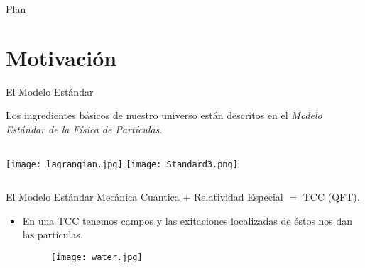 \documentclass{beamer}
\title %
{}
\author %
{}
\date {}
\begin{document}
{
\begin{frame}
\titlepage
\end{frame}
}



\begin{frame}{Plan}
  \tableofcontents
\end{frame}




\section{Motivación}


\begin{frame}{El Modelo Estándar}
\begin{block}{}
Los ingredientes básicos de nuestro universo están descritos en el \textit{Modelo Estándar de la Física de Partículas}.
\end{block}
  \vspace{5mm}
  \begin{columns}
\texttt{[image: lagrangian.jpg]}
\texttt{[image: Standard3.png]}
\end{columns}

\end{frame}

\begin{frame}{El Modelo Estándar}
Mecánica Cuántica $+$ Relatividad Especial $=$ TCC (QFT).
\vspace{5mm}
 \begin{itemize}
  \item
    En una TCC tenemos campos y las exitaciones localizadas de éstos nos dan las partículas.
    \begin{figure}
\texttt{[image: water.jpg]}
\end{figure}
  \end{itemize}
\end{frame}
\end{document}
